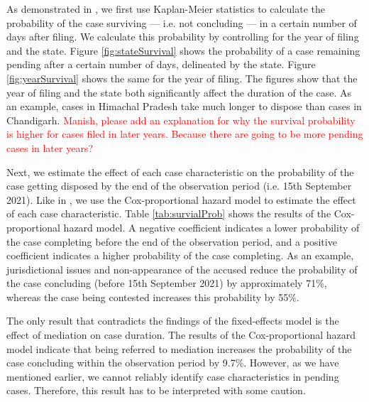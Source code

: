 As demonstrated in \textcite{datta2017_itatDelays}, we first use Kaplan-Meier statistics to calculate the probability of the case surviving --- i.e. not concluding --- in a certain number of days after filing. We calculate this probability by controlling for the year of filing and the state. Figure \ref{fig:stateSurvival} shows the probability of a case remaining pending after a certain number of days, delineated by the state. Figure \ref{fig:yearSurvival} shows the same for the year of filing. The figures show that the year of filing and the state both significantly affect the duration of the case. As an example, cases in Himachal Pradesh take much longer to dispose than cases in Chandigarh. \textcolor{red}{Manish, please add an explanation for why the survival probability is higher for cases filed in later years. Because there are going to be more pending cases in later years?}

Next, we estimate the effect of each case characteristic on the probability of the case getting disposed by the end of the observation period (i.e. 15th September 2021). Like in \textcite{datta2017_itatDelays}, we use the Cox-proportional hazard model to estimate the effect of each case characteristic. Table \ref{tab:survialProb} shows the results of the Cox-proportional hazard model. A negative coefficient indicates a lower probability of the case completing before the end of the observation period, and a positive coefficient indicates a higher probability of the case completing. As an example, jurisdictional issues and non-appearance of the accused reduce the probability of the case concluding (before 15th September 2021) by approximately 71\%, whereas the case being contested increases this probability by 55\%.

The only result that contradicts the findings of the fixed-effects model is the effect of mediation on case duration. The results of the Cox-proportional hazard model indicate that being referred to mediation increases the probability of the case concluding within the observation period by 9.7\%. However, as we have mentioned earlier, we cannot reliably identify case characteristics in pending cases. Therefore, this result has to be interpreted with some caution.

